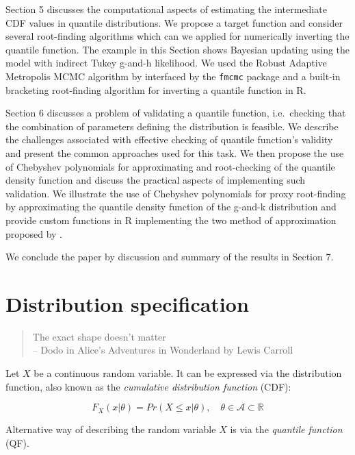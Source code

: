 \documentclass[
  12pt,
]{article}
\begin{document}
Section 5 discusses the computational aspects of estimating the intermediate CDF values in quantile distributions. We propose a target function and consider several root-finding algorithms which can we applied for numerically inverting the quantile function. The example in this Section shows Bayesian updating using the model with indirect Tukey g-and-h likelihood. We used the Robust Adaptive Metropolis MCMC algorithm by \citet{vihola2012RobustAdaptiveMetropolis} interfaced by the \texttt{fmcmc} package \citep{vegayon2019FmcmcFriendlyMCMC} and a built-in bracketing root-finding algorithm for inverting a quantile function in R.

Section 6 discusses a problem of validating a quantile function, i.e.~checking that the combination of parameters defining the distribution is feasible. We describe the challenges associated with effective checking of quantile function's validity and present the common approaches used for this task. We then propose the use of Chebyshev polynomials \citep{boyd2006ComputingRealRoots} for approximating and root-checking of the quantile density function and discuss the practical aspects of implementing such validation. We illustrate the use of Chebyshev polynomials for proxy root-finding by approximating the quantile density function of the g-and-k distribution and provide custom functions in R implementing the two method of approximation proposed by \citet{boyd2013FindingZerosUnivariate}.

We conclude the paper by discussion and summary of the results in Section 7.

\hypertarget{distribution-specification}{%
\section{Distribution specification}\label{distribution-specification}}

\begin {quotation}
The exact shape doesn't matter \\ 
-- Dodo in Alice's Adventures in Wonderland by Lewis Carroll 
\end{quotation}

Let \(X\) be a continuous random variable. It can be expressed via the distribution function, also known as the \emph{cumulative distribution function} (CDF):

\[
F_X(x | \theta)=Pr(X \leq x | \theta), \quad \theta \in \mathcal A \subset \mathbb R
\]

Alternative way of describing the random variable \(X\) is via the \emph{quantile function} (QF).
\end{document}
